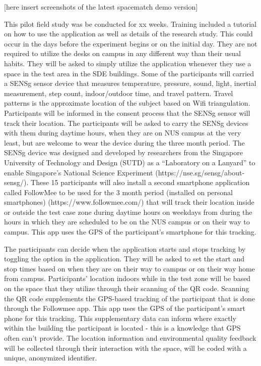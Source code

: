 \documentclass[]{interact}
\theoremstyle{plain}%
\theoremstyle{definition}
\theoremstyle{remark}
\begin{document}
[here insert screenshots of the latest spacematch demo version]

This pilot field study was be conducted for xx weeks. Training  included a tutorial on how to use the application as well as details of the research study. This could occur in the days before the experiment begins or on the initial day. They are not required to utilize the desks on campus in any different way than their usual habits. They will be asked to simply utilize the application whenever they use a space in the test area in the SDE buildings. Some of the participants will carried a SENSg sensor device that measures temperature, pressure, sound, light, inertial measurement, step count, indoor/outdoor time, and travel pattern. Travel patterns is the approximate location of the subject based on Wifi triangulation. Participants will be informed in the consent process that the SENSg sensor will track their location. The participants will be asked to carry the SENSg devices with them during daytime hours, when they are on NUS campus at the very least, but are welcome to wear the device during the three month period. The SENSg device was designed and developed by researchers from the Singapore University of Technology and Design (SUTD) as a “Laboratory on a Lanyard” to enable Singapore’s National Science Experiment (https://nse.sg/sensg/about-sensg/). These 15 participants will also install a second smartphone application called FollowMee to be used for the 3 month period (installed on personal smartphones) (https://www.followmee.com/) that will track their location inside or outside the test case zone during daytime hours on weekdays from during the hours in which they are scheduled to be on the NUS campus or on their way to campus. This app uses the GPS of the participant’s smartphone for this tracking. 

The participants can decide when the application starts and stops tracking by toggling the option in the application. They will be asked to set the start and stop times based on when they are on their way to campus or on their way home from campus. Participants’ location indoors while in the test zone will be based on the space that they utilize through their scanning of the QR code. Scanning the QR code supplements the GPS-based tracking of the participant that is done through the Followmee app. This app uses the GPS of the participant’s smart phone for this tracking. This supplementary data can inform where exactly within the building the participant is located - this is a knowledge that GPS often can’t provide. The location information and environmental quality feedback will be collected through their interaction with the space, will be coded with a unique, anonymized identifier. 
\end{document}
